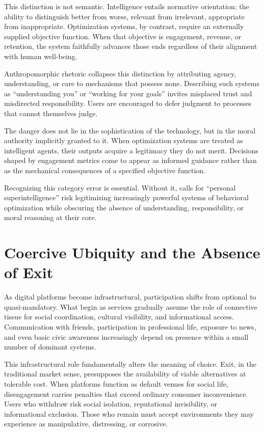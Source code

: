 \documentclass[12pt]{article}
\begin{document}
This distinction is not semantic. Intelligence entails normative orientation: the ability to distinguish better from worse, relevant from irrelevant, appropriate from inappropriate. Optimization systems, by contrast, require an externally supplied objective function. When that objective is engagement, revenue, or retention, the system faithfully advances those ends regardless of their alignment with human well-being.

Anthropomorphic rhetoric collapses this distinction by attributing agency, understanding, or care to mechanisms that possess none. Describing such systems as ``understanding you'' or ``working for your goals'' invites misplaced trust and misdirected responsibility. Users are encouraged to defer judgment to processes that cannot themselves judge.

The danger does not lie in the sophistication of the technology, but in the moral authority implicitly granted to it. When optimization systems are treated as intelligent agents, their outputs acquire a legitimacy they do not merit. Decisions shaped by engagement metrics come to appear as informed guidance rather than as the mechanical consequences of a specified objective function.

Recognizing this category error is essential. Without it, calls for ``personal superintelligence'' risk legitimizing increasingly powerful systems of behavioral optimization while obscuring the absence of understanding, responsibility, or moral reasoning at their core.

\section{Coercive Ubiquity and the Absence of Exit}

As digital platforms become infrastructural, participation shifts from optional to quasi-mandatory. What begin as services gradually assume the role of connective tissue for social coordination, cultural visibility, and informational access. Communication with friends, participation in professional life, exposure to news, and even basic civic awareness increasingly depend on presence within a small number of dominant systems.

This infrastructural role fundamentally alters the meaning of choice. Exit, in the traditional market sense, presupposes the availability of viable alternatives at tolerable cost. When platforms function as default venues for social life, disengagement carries penalties that exceed ordinary consumer inconvenience. Users who withdraw risk social isolation, reputational invisibility, or informational exclusion. Those who remain must accept environments they may experience as manipulative, distressing, or corrosive.
\end{document}
